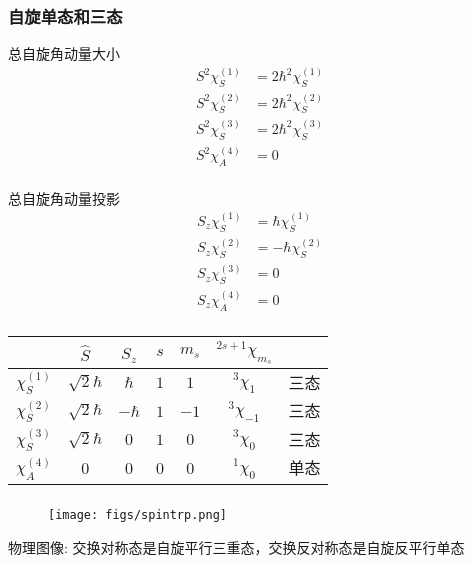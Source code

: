 \begin{frame}[label=current]
  \frametitle{自旋单态和三态}
  \begin{minipage}[b]{0.49\textwidth}
  总自旋角动量大小 
  \[ \begin{aligned}
    S^2 \chi ^{(1)}_S &= 2 \hbar^2  \chi ^{(1)}_S \\
    S^2 \chi ^{(2)}_S &= 2 \hbar^2  \chi ^{(2)}_S \\
    S^2 \chi ^{(3)}_S &= 2 \hbar^2  \chi ^{(3)}_S \\
    S^2 \chi ^{(4)}_A &= 0 \\
  \end{aligned}
  \]
  \end{minipage}
  \begin{minipage}[b]{0.49\textwidth}
    总自旋角动量投影
    \[ \begin{aligned}
      S_z \chi ^{(1)}_S &= \hbar \chi ^{(1)}_S \\
      S_z \chi ^{(2)}_S &= -\hbar \chi ^{(2)}_S \\
      S_z \chi ^{(3)}_S &= 0 \\
      S_z \chi ^{(4)}_A &= 0 \\
    \end{aligned}
    \]  
\end{minipage}
\begin{table}[htbp]
  \centering\begin{tabular}{ccccccc}
  \toprule
   & $\hat{S}$ & $\hat{S}_z$ & $s$ & $m_s$ & $^{2s+1}\chi_{m_s}$ \\
   \midrule
   $\chi ^{(1)}_S$ & $\sqrt{2} \hbar$ & $\hbar$ & $1$ & $1$ & $^{3}\chi_{1}$ & $\text{三态}$ \\ 
   $\chi ^{(2)}_S$ & $\sqrt{2} \hbar$ & $-\hbar$ & $1$ & $-1$ & $^{3}\chi_{-1}$ & $\text{三态}$ \\
   $\chi ^{(3)}_S$ & $\sqrt{2} \hbar$ & $0$ & $1$ & $0$ & $^{3}\chi_{0}$ & $\text{三态}$ \\ 
   $\chi ^{(4)}_A$ & $0 $ & $0$ & $0$ & $0$ & $^{1}\chi_{0}$ & $\text{单态}$\\
   \bottomrule   
  \end{tabular}
\end{table}
\end{frame} 

\begin{frame}[label=current]
  \frametitle{}
\begin{figure}[htbp]
  \centering
  \texttt{[image: figs/spintrp.png]}
\end{figure}
物理图像: 交换对称态是自旋平行三重态，交换反对称态是自旋反平行单态
\end{frame} 

